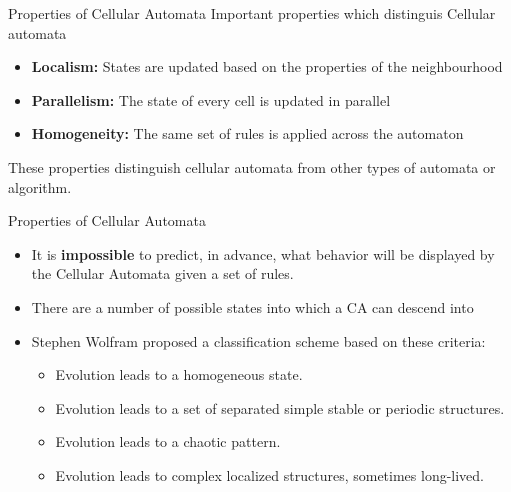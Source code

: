 \begin{frame}{Properties of Cellular Automata}
Important properties which distinguis Cellular automata
\begin{itemize}
    \item \textbf{Localism:} States are updated based on the properties of the neighbourhood
    \item \textbf{Parallelism:} The state of every cell is updated in parallel
    \item \textbf{Homogeneity:} The same set of rules is applied across the automaton
\end{itemize}
\begin{center}
   These properties distinguish cellular automata from other types of automata or algorithm. 
\end{center}


\end{frame}



\begin{frame}{Properties of Cellular Automata}
\begin{itemize}
    \item It is \textbf{impossible} to predict, in advance, what behavior will be displayed by the Cellular Automata given a set of rules.
    \item There are a number of possible states into which a CA can descend into
    \item Stephen  Wolfram proposed a classification scheme based on these criteria:
    \begin{itemize}
        \item Evolution leads to a homogeneous state. 
    \item Evolution leads to a set of separated simple stable or periodic structures. 
    \item Evolution leads to a chaotic pattern. 
    \item Evolution leads to complex localized structures, sometimes long-lived.
    \end{itemize}

\end{itemize}
\end{frame}

